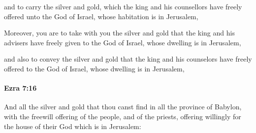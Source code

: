 			\begin{versebox}
					\item[BHS] 
					\item[LXX] 
					\item[ASV] and to carry the silver and gold, which the king and his counsellors have freely offered unto the God of Israel, whose habitation is in Jerusalem,
					\item[NIV] Moreover, you are to take with you the silver and gold that the king and his advisers have freely given to the God of Israel, whose dwelling is in Jerusalem,
					\item[NRSV] and also to convey the silver and gold that the king and his counselors have freely offered to the God of Israel, whose dwelling is in Jerusalem,
			\end{versebox}

		\paragraph{Ezra 7:16} %
			\label{EZRA-7-16}

			And all the silver and gold that thou canst find in all the province of Babylon, with the freewill offering of the people, and of the priests, offering willingly for the house of their God which is in Jerusalem:

